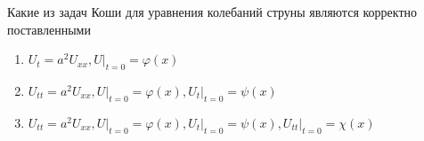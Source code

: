 Какие из задач Коши для уравнения колебаний струны являются корректно поставленными

\begin{enumerate}[label=\arabic*)]
    \item \(U_t=a^2U_{xx} , U\vert _{t=0}=\varphi \left(x\right)\)
    \item \(U_{tt}=a^2U_{xx}, U\vert _{t=0}=\varphi (x) , U_t\vert _{t=0}=\psi (x)\)
    \item \(U_{tt}=a^2U_{xx}, U\vert _{t=0}=\varphi \left(x\right) , U_t\vert _{t=0}=\psi \left(x\right), U_{tt}\vert _{t=0}=\chi \left(x\right)\)
\end{enumerate}

